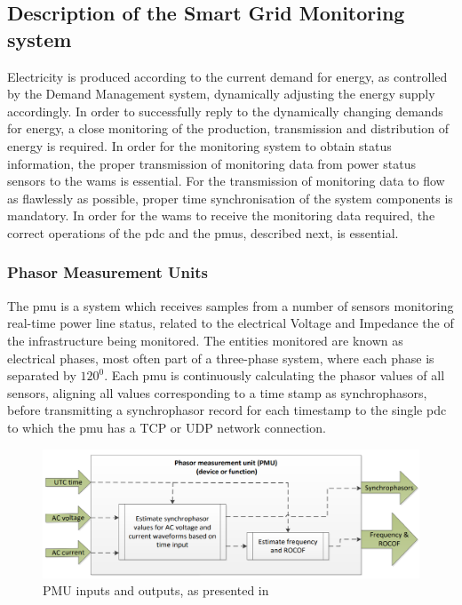 \subsection{Description of the Smart Grid  Monitoring system}
Electricity is produced according to the current demand for energy, as controlled by the Demand Management system, dynamically adjusting the energy supply accordingly. In order to successfully reply to the dynamically changing demands for energy, a close monitoring of the production, transmission and distribution of energy is required. In order for the monitoring system to obtain status information, the proper transmission of monitoring data from power status sensors to the \acrshort{wams} is essential. For the transmission of monitoring data to flow as flawlessly as possible, proper time synchronisation of the system components is mandatory.
In order for the \acrshort{wams} to receive the monitoring data required, the correct operations of the \acrshort{pdc} and the \acrshort{pmu}s, described next, is essential.



\subsubsection{Phasor Measurement Units}
The \acrfull{pmu} is a system which receives samples from a number of sensors monitoring  real-time power line status, related to the electrical Voltage and Impedance the of the infrastructure being monitored. 
The entities monitored are known as electrical phases, most often part of a three-phase system, where each phase is separated by $120^0$.
Each \acrshort{pmu} is continuously calculating the phasor values of all sensors, aligning all values corresponding to a time stamp as synchrophasors, before transmitting a synchrophasor record for each timestamp to the single \acrfull{pdc} to which the \acrshort{pmu} has a  TCP or UDP network connection. 





\begin{figure}%
\includegraphics[width=\linewidth]{figures/PMU-in-out.png}
\caption[PMU inputs and outputs]{PMU inputs and outputs, as presented in \Cite[p.12]{iec2018measuring}
}
\label{fig:PMU-in-out}
\end{figure}


